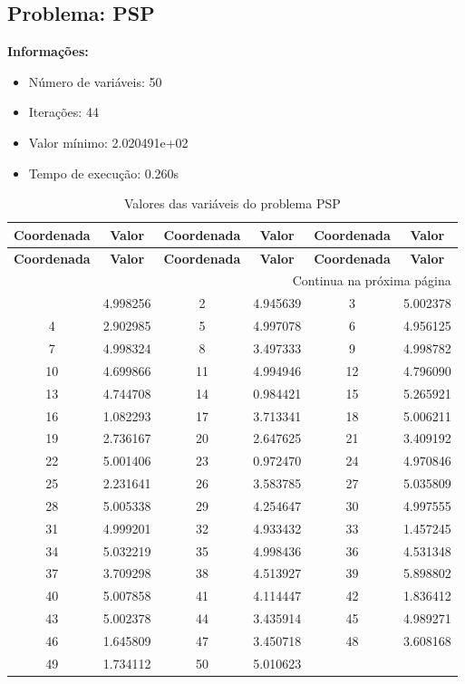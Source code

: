 \documentclass[12pt]{article}
\begin{document}
\newpage            
\subsection{Problema: PSP}

\textbf{Informações:}
\begin{itemize}
\item Número de variáveis: 50
\item Iterações: 44
\item Valor mínimo: 2.020491e+02
\item Tempo de execução: 0.260s
\end{itemize}

\small
\begin{longtable}{@{}cc|cc|cc@{}}
\caption{Valores das variáveis do problema PSP} \\
\toprule
\textbf{Coordenada} & \textbf{Valor} & \textbf{Coordenada} & \textbf{Valor} & \textbf{Coordenada} & \textbf{Valor} \\
\midrule
\endfirsthead

\toprule
\textbf{Coordenada} & \textbf{Valor} & \textbf{Coordenada} & \textbf{Valor} & \textbf{Coordenada} & \textbf{Valor} \\
\midrule
\endhead

\midrule \multicolumn{6}{r}{{Continua na próxima página}} \\ \midrule
\endfoot

\bottomrule
\endlastfoot
1 & 4.998256 & 2 & 4.945639 & 3 & 5.002378 \\
4 & 2.902985 & 5 & 4.997078 & 6 & 4.956125 \\
7 & 4.998324 & 8 & 3.497333 & 9 & 4.998782 \\
10 & 4.699866 & 11 & 4.994946 & 12 & 4.796090 \\
13 & 4.744708 & 14 & 0.984421 & 15 & 5.265921 \\
16 & 1.082293 & 17 & 3.713341 & 18 & 5.006211 \\
19 & 2.736167 & 20 & 2.647625 & 21 & 3.409192 \\
22 & 5.001406 & 23 & 0.972470 & 24 & 4.970846 \\
25 & 2.231641 & 26 & 3.583785 & 27 & 5.035809 \\
28 & 5.005338 & 29 & 4.254647 & 30 & 4.997555 \\
31 & 4.999201 & 32 & 4.933432 & 33 & 1.457245 \\
34 & 5.032219 & 35 & 4.998436 & 36 & 4.531348 \\
37 & 3.709298 & 38 & 4.513927 & 39 & 5.898802 \\
40 & 5.007858 & 41 & 4.114447 & 42 & 1.836412 \\
43 & 5.002378 & 44 & 3.435914 & 45 & 4.989271 \\
46 & 1.645809 & 47 & 3.450718 & 48 & 3.608168 \\
49 & 1.734112 & 50 & 5.010623 &  &  \\

\end{longtable}
\end{document}
